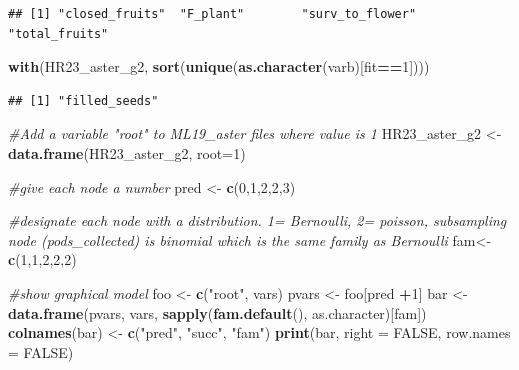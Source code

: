 \documentclass[
]{article}
\newenvironment{Shaded}{\begin{snugshade}}{\end{snugshade}}
\newcommand{\AttributeTok}[1]{\textcolor[rgb]{0.13,0.29,0.53}{#1}}
\newcommand{\CommentTok}[1]{\textcolor[rgb]{0.56,0.35,0.01}{\textit{#1}}}
\newcommand{\ConstantTok}[1]{\textcolor[rgb]{0.56,0.35,0.01}{#1}}
\newcommand{\DecValTok}[1]{\textcolor[rgb]{0.00,0.00,0.81}{#1}}
\newcommand{\FunctionTok}[1]{\textcolor[rgb]{0.13,0.29,0.53}{\textbf{#1}}}
\newcommand{\NormalTok}[1]{#1}
\newcommand{\OtherTok}[1]{\textcolor[rgb]{0.56,0.35,0.01}{#1}}
\newcommand{\SpecialCharTok}[1]{\textcolor[rgb]{0.81,0.36,0.00}{\textbf{#1}}}
\newcommand{\StringTok}[1]{\textcolor[rgb]{0.31,0.60,0.02}{#1}}
\begin{document}
\begin{verbatim}
## [1] "closed_fruits"  "F_plant"        "surv_to_flower" "total_fruits"
\end{verbatim}

\begin{Shaded}
\begin{Highlighting}[]
\FunctionTok{with}\NormalTok{(HR23\_aster\_g2, }\FunctionTok{sort}\NormalTok{(}\FunctionTok{unique}\NormalTok{(}\FunctionTok{as.character}\NormalTok{(varb)[fit}\SpecialCharTok{==}\DecValTok{1}\NormalTok{])))}
\end{Highlighting}
\end{Shaded}

\begin{verbatim}
## [1] "filled_seeds"
\end{verbatim}

\begin{Shaded}
\begin{Highlighting}[]
\CommentTok{\#Add a variable "root" to ML19\_aster files where value is 1}
\NormalTok{HR23\_aster\_g2 }\OtherTok{\textless{}{-}} \FunctionTok{data.frame}\NormalTok{(HR23\_aster\_g2, }\AttributeTok{root=}\DecValTok{1}\NormalTok{)}

\CommentTok{\#give each node a number}
\NormalTok{pred }\OtherTok{\textless{}{-}} \FunctionTok{c}\NormalTok{(}\DecValTok{0}\NormalTok{,}\DecValTok{1}\NormalTok{,}\DecValTok{2}\NormalTok{,}\DecValTok{2}\NormalTok{,}\DecValTok{3}\NormalTok{)}

\CommentTok{\#designate each node with a distribution. 1= Bernoulli, 2= poisson, subsampling node (pods\_collected) is binomial which is the same family as Bernoulli}
\NormalTok{fam}\OtherTok{\textless{}{-}}\FunctionTok{c}\NormalTok{(}\DecValTok{1}\NormalTok{,}\DecValTok{1}\NormalTok{,}\DecValTok{2}\NormalTok{,}\DecValTok{2}\NormalTok{,}\DecValTok{2}\NormalTok{)}

\CommentTok{\#show graphical model}
\NormalTok{foo }\OtherTok{\textless{}{-}} \FunctionTok{c}\NormalTok{(}\StringTok{"root"}\NormalTok{, vars)}
\NormalTok{pvars }\OtherTok{\textless{}{-}}\NormalTok{ foo[pred }\SpecialCharTok{+}\DecValTok{1}\NormalTok{]}
\NormalTok{bar }\OtherTok{\textless{}{-}}\FunctionTok{data.frame}\NormalTok{(pvars, vars, }\FunctionTok{sapply}\NormalTok{(}\FunctionTok{fam.default}\NormalTok{(), as.character)[fam])}
\FunctionTok{colnames}\NormalTok{(bar) }\OtherTok{\textless{}{-}} \FunctionTok{c}\NormalTok{(}\StringTok{"pred"}\NormalTok{, }\StringTok{"succ"}\NormalTok{, }\StringTok{"fam"}\NormalTok{)}
\FunctionTok{print}\NormalTok{(bar, }\AttributeTok{right =} \ConstantTok{FALSE}\NormalTok{, }\AttributeTok{row.names =} \ConstantTok{FALSE}\NormalTok{)}
\end{Highlighting}
\end{Shaded}
\end{document}
